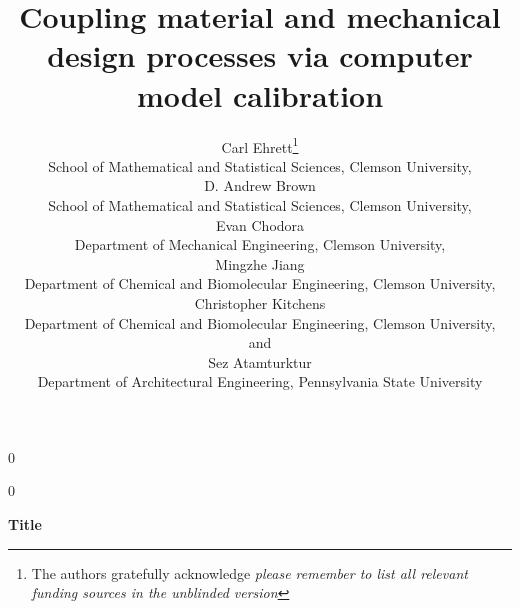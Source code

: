 \documentclass[12pt]{article}
\newcommand{\blind}{0}
\begin{document}
%

\def\spacingset#1{\renewcommand{\baselinestretch}%
{#1}\small\normalsize} \spacingset{1}



\blind
{
  \title{\bf Coupling material and mechanical design processes via computer model calibration}
  \author{Carl Ehrett\thanks{
    The authors gratefully acknowledge \textit{please remember to list all relevant funding sources in the unblinded version}}\hspace{.2cm}\\
    School of Mathematical and Statistical Sciences, Clemson University,\\
    D. Andrew Brown \\
    School of Mathematical and Statistical Sciences, Clemson University,\\
    Evan Chodora \\
    Department of Mechanical Engineering, Clemson University,\\
    Mingzhe Jiang \\
    Department of Chemical and Biomolecular Engineering, Clemson University,\\
    Christopher Kitchens \\
    Department of Chemical and Biomolecular Engineering, Clemson University,\\
    and \\
    Sez Atamturktur \\
    Department of Architectural Engineering, Pennsylvania State University\\}
  \maketitle
} \fi

\blind
{
  \bigskip
  \bigskip
  \bigskip
  \begin{center}
    {\LARGE\bf Title}
\end{center}
  \medskip
} \fi
\end{document}
